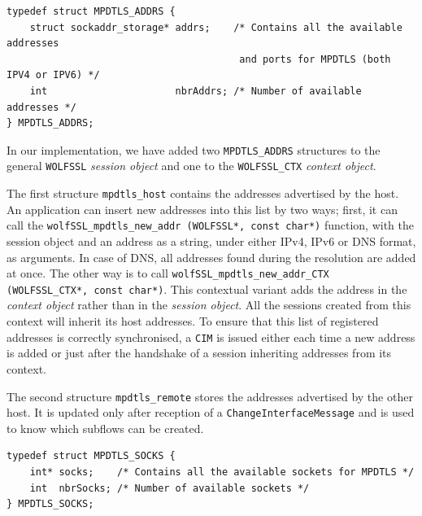
\begin{lstlisting}[caption=Structure storing addresses]
typedef struct MPDTLS_ADDRS {
    struct sockaddr_storage* addrs;    /* Contains all the available addresses
                                        and ports for MPDTLS (both IPV4 or IPV6) */
    int                      nbrAddrs; /* Number of available addresses */
} MPDTLS_ADDRS;
\end{lstlisting}

In our implementation, we have added two \texttt{MPDTLS\_ADDRS} structures to the general \texttt{WOLFSSL} \textit{session object} and one to the \texttt{WOLFSSL\_CTX} \textit{context object}.

The first structure \texttt{mpdtls\_host} contains the addresses advertised by the host. An application can insert new addresses into this list by two ways; first, it can call the \texttt{wolfSSL\_mpdtls\_new\_addr (WOLFSSL*, const char*)} function, with the session object and an address as a string, under either IPv4, IPv6 or DNS format, as arguments. In case of DNS, all addresses found during the resolution are added at once. The other way is to call \texttt{wolfSSL\_mpdtls\_new\_addr\_CTX (WOLFSSL\_CTX*, const char*)}. This contextual variant adds the address in the \textit{context object} rather than in the \textit{session object}. All the sessions created from this context will inherit its host addresses. To ensure that this list of registered addresses is correctly synchronised, a \texttt{CIM} is issued either each time a new address is added or just after the handshake of a session inheriting addresses from its context.

The second structure \texttt{mpdtls\_remote} stores the addresses advertised by the other host. It is updated only after reception of a \texttt{ChangeInterfaceMessage} and is used to know which subflows can be created.

\begin{lstlisting}[caption=Structure containing inactive socket,label=lst:sockpool]
typedef struct MPDTLS_SOCKS {
    int* socks;    /* Contains all the available sockets for MPDTLS */
    int  nbrSocks; /* Number of available sockets */
} MPDTLS_SOCKS;
\end{lstlisting}

